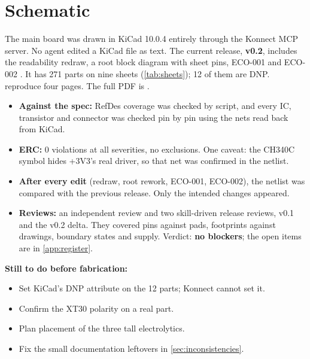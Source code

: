 \section{Schematic}\label{sec:schematic}

The main board was drawn in KiCad 10.0.4 entirely through the Konnect MCP server. No agent edited a KiCad file as text. The current release, \textbf{v0.2}, includes the readability redraw, a root block diagram with sheet pins, ECO-001 and ECO-002 . It has 271 parts on nine sheets (\cref{tab:sheets}); 12 of them are DNP.  reproduce four pages. The full PDF is .

\begin{checked}
\begin{itemize}[leftmargin=1.2em,itemsep=1pt]
  \item \textbf{Against the spec:} RefDes coverage was checked by script, and every IC, transistor and connector was checked pin by pin using the nets read back from KiCad.
  \item \textbf{ERC:} 0 violations at all severities, no exclusions. One caveat: the CH340C symbol hides +3V3's real driver, so that net was confirmed in the netlist.
  \item \textbf{After every edit} (redraw, root rework, ECO-001, ECO-002), the netlist was compared with the previous release. Only the intended changes appeared.
  \item \textbf{Reviews:} an independent review and two skill-driven release reviews, v0.1 and the v0.2 delta. They covered pins against pads, footprints against drawings, boundary states and supply. Verdict: \textbf{no blockers}; the open items are in \cref{app:register}.
\end{itemize}
\end{checked}

\textbf{Still to do before fabrication:}
\begin{itemize}
  \item Set KiCad's DNP attribute on the 12 parts; Konnect cannot set it.
  \item Confirm the XT30 polarity on a real part.
  \item Plan placement of the three tall electrolytics.
  \item Fix the small documentation leftovers in \cref{sec:inconsistencies}.
\end{itemize}

